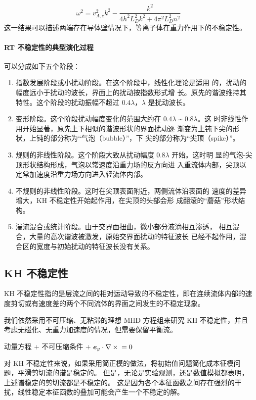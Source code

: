 \begin{equation}
\omega^2 = v_{A,c}^2 k^2 - \frac{ k^2}{4 h^2 L_D^2 k^2 + 4 \pi^2 L_D^2 n^2}
\end{equation}
这一结果可以描述两端存在导体壁情况下，等离子体在重力作用下的不稳定性。

\paragraph{RT 不稳定性的典型演化过程}
可以分成如下五个阶段：
\begin{enumerate}
\item 指数发展阶段或小扰动阶段。在这个阶段中，线性化理论是适用
的，扰动的幅度远小于扰动的波长，界面上的扰动按指数形式增
长。原先的谐波维持其特性。这个阶段的扰动振幅不超过 $0.4\lambda$，$\lambda$
是扰动波长。
\item 变形阶段。这个阶段扰动幅度变化的范围大约在 $0.4\lambda$ \~{} $0.8\lambda$。这
时非线性作用开始显著，原先上下相似的谐波形状的界面扰动逐
渐变为上钝下尖的形状，上钝的部分称为“气泡（bubble）”，下
尖的部分称为“尖顶（spike）”。
\item 规则的非线性阶段。这个阶段大致从扰动幅度 $0.8\lambda$ 开始。这时明
显的气泡-尖顶形状结构形成，气泡以常速度沿重力场的反方向进
入重流体内部，尖顶以定常加速度沿重力场方向进入轻流体内部。
\item 不规则的非线性阶段。这时在尖顶表面附近，两侧流体沿表面的
速度的差异增大，KH 不稳定性开始起作用，在尖顶的头部会形
成翻滚的“蘑菇”形状结构。
\item 湍流混合或统计阶段。由于交界面扭曲，微小部分液滴相互渗透，
相互混合，大量的高次谐波被激发，原始交界面扰动的特征波长
已经不起作用，混合区的宽度与初始扰动的特征波长没有关系。
\end{enumerate}

\subsection{KH 不稳定性}

KH 不稳定性指的是层流之间的相对运动导致的不稳定性，即在连续流体内部的速度剪切或有速度差的两个不同流体的界面之间发生的不稳定现象。

我们依然采用不可压缩、无粘滞的理想 MHD 方程组来研究 KH 不稳定性，并且考虑无磁化、无重力加速度的情况，但需要保留平衡流。

动量方程 + 不可压缩条件 + $\bm{e}_y \cdot \nabla \times {} = 0$

对 KH 不稳定性来说，如果采用简正模的做法，将初始值问题简化成本征模问题，平滑剪切流的谱是稳定的。
但是，无论是实验观测，还是数值模拟都表明，上述谱稳定的剪切流都是不稳定的。
这是因为各个本征函数之间存在强烈的干扰，线性稳定本征函数的叠加可能会产生一个不稳定的解。

